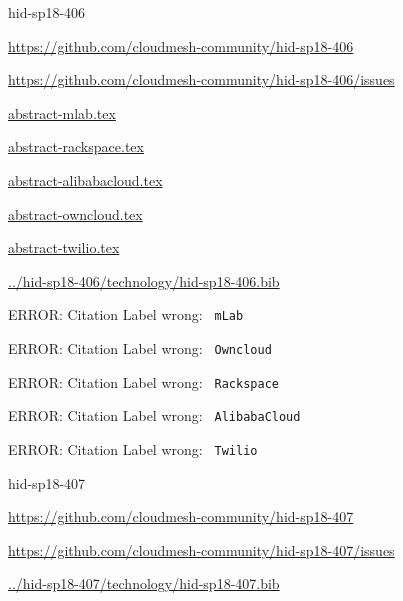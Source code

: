 \begin{IU}

hid-sp18-406

\url{https://github.com/cloudmesh-community/hid-sp18-406}

\url{https://github.com/cloudmesh-community/hid-sp18-406/issues}

\href{https://github.com/cloudmesh-community/hid-sp18-406/blob/master//technology/abstract-mlab.tex}{abstract-mlab.tex}

\href{https://github.com/cloudmesh-community/hid-sp18-406/blob/master//technology/abstract-rackspace.tex}{abstract-rackspace.tex}

\href{https://github.com/cloudmesh-community/hid-sp18-406/blob/master//technology/abstract-alibabacloud.tex}{abstract-alibabacloud.tex}

\href{https://github.com/cloudmesh-community/hid-sp18-406/blob/master//technology/abstract-owncloud.tex}{abstract-owncloud.tex}

\href{https://github.com/cloudmesh-community/hid-sp18-406/blob/master//technology/abstract-twilio.tex}{abstract-twilio.tex}

\href{https://github.com/cloudmesh-community/hid-sp18-406/blob/master//technology/hid-sp18-406.bib}{../hid-sp18-406/technology/hid-sp18-406.bib}

 ERROR: Citation Label wrong: \verb| mLab |

 ERROR: Citation Label wrong: \verb| Owncloud |

 ERROR: Citation Label wrong: \verb| Rackspace |

 ERROR: Citation Label wrong: \verb| AlibabaCloud |

 ERROR: Citation Label wrong: \verb| Twilio |

\end{IU}


\begin{IU}

hid-sp18-407

\url{https://github.com/cloudmesh-community/hid-sp18-407}

\url{https://github.com/cloudmesh-community/hid-sp18-407/issues}

\href{https://github.com/cloudmesh-community/hid-sp18-407/blob/master//technology/hid-sp18-407.bib}{../hid-sp18-407/technology/hid-sp18-407.bib}

\end{IU}



